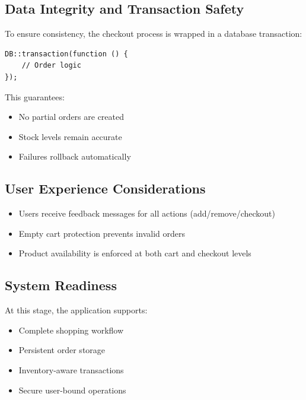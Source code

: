\documentclass[12pt,a4paper]{article}
\begin{document}
\subsection{Data Integrity and Transaction Safety}

To ensure consistency, the checkout process is wrapped in a database transaction:

\begin{verbatim}
DB::transaction(function () {
    // Order logic
});
\end{verbatim}

This guarantees:
\begin{itemize}[noitemsep]
    \item No partial orders are created
    \item Stock levels remain accurate
    \item Failures rollback automatically
\end{itemize}

\subsection{User Experience Considerations}

\begin{itemize}[noitemsep]
    \item Users receive feedback messages for all actions (add/remove/checkout)
    \item Empty cart protection prevents invalid orders
    \item Product availability is enforced at both cart and checkout levels
\end{itemize}

\subsection{System Readiness}

At this stage, the application supports:
\begin{itemize}[noitemsep]
    \item Complete shopping workflow
    \item Persistent order storage
    \item Inventory-aware transactions
    \item Secure user-bound operations
\end{itemize}
\end{document}
